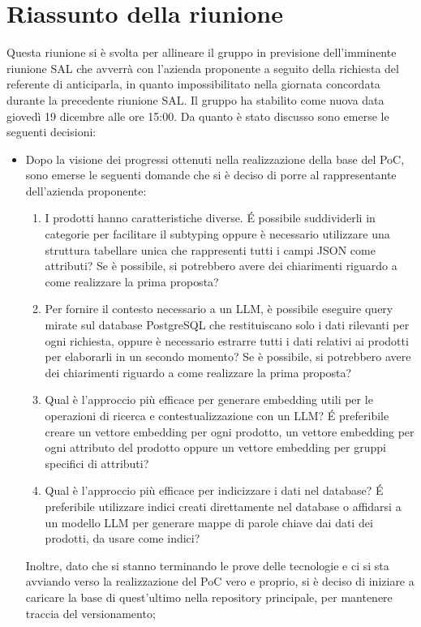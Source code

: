 \section{Riassunto della riunione}
Questa riunione si è svolta per allineare il gruppo in previsione dell'imminente riunione SAL che avverrà con l’azienda proponente a seguito della richiesta del referente di anticiparla, in quanto impossibilitato nella giornata concordata durante la precedente riunione SAL. Il gruppo ha stabilito come nuova data giovedì 19 dicembre alle ore 15:00.
Da quanto è stato discusso sono emerse le seguenti decisioni:
\begin{itemize}
    \item Dopo la visione dei progressi ottenuti nella realizzazione della base del PoC, sono emerse le seguenti domande che si è deciso di porre al rappresentante dell'azienda proponente:
    \begin{enumerate}
        \item I prodotti hanno caratteristiche diverse. \'E possibile suddividerli in categorie per facilitare il subtyping oppure è necessario utilizzare una struttura tabellare unica che rappresenti tutti i campi JSON come attributi? Se è possibile, si potrebbero avere dei chiarimenti riguardo a come realizzare la prima proposta?
        \item Per fornire il contesto necessario a un LLM, è possibile eseguire query mirate sul database PostgreSQL che restituiscano solo i dati rilevanti per ogni richiesta, oppure è necessario estrarre tutti i dati relativi ai prodotti per elaborarli in un secondo momento? Se è possibile, si potrebbero avere dei chiarimenti riguardo a come realizzare la prima proposta?
        \item Qual è l'approccio più efficace per generare embedding utili per le operazioni di ricerca e contestualizzazione con un LLM? \'E preferibile creare un vettore embedding per ogni prodotto, un vettore embedding per ogni attributo del prodotto oppure un vettore embedding per gruppi specifici di attributi?
        \item Qual è l'approccio più efficace per indicizzare i dati nel database? \'E preferibile utilizzare indici creati direttamente nel database o affidarsi a un modello LLM per generare mappe di parole chiave dai dati dei prodotti, da usare come indici?
    \end{enumerate}
    Inoltre, dato che si stanno terminando le prove delle tecnologie e ci si sta avviando verso la realizzazione del PoC vero e proprio, si è deciso di iniziare a caricare la base di quest'ultimo nella repository principale, per mantenere traccia del versionamento;

\end{itemize}
